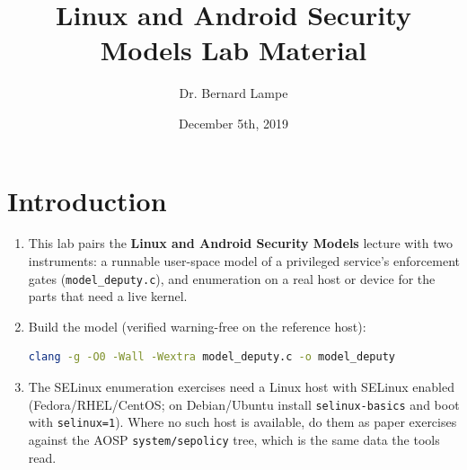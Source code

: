 \documentclass[12pt]{Training}
\title{Linux and Android Security Models Lab Material}
\author{Dr. Bernard Lampe}
\date{December 5th, 2019}
\begin{document}
\maketitle


\section*{Introduction}
\begin{enumerate}
    \item This lab pairs the \textbf{Linux and Android Security Models} lecture with two instruments: a runnable user-space model of a privileged service's enforcement gates (\lstinline{model_deputy.c}), and enumeration on a real host or device for the parts that need a live kernel.
    \item Build the model (verified warning-free on the reference host):
    \begin{lstlisting}[language=bash]
clang -g -O0 -Wall -Wextra model_deputy.c -o model_deputy
    \end{lstlisting}
    \item The SELinux enumeration exercises need a Linux host with SELinux enabled (Fedora/RHEL/CentOS; on Debian/Ubuntu install \lstinline{selinux-basics} and boot with \lstinline{selinux=1}). Where no such host is available, do them as paper exercises against the AOSP \lstinline{system/sepolicy} tree, which is the same data the tools read.
\end{enumerate}
\end{document}
